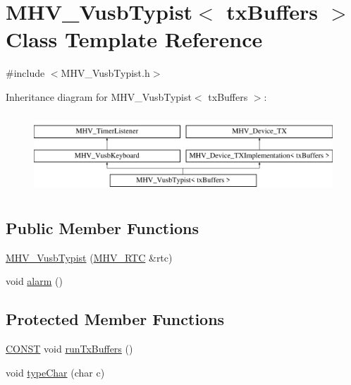 \hypertarget{class_m_h_v___vusb_typist}{\section{M\-H\-V\-\_\-\-Vusb\-Typist$<$ tx\-Buffers $>$ Class Template Reference}
\label{class_m_h_v___vusb_typist}
}


{\ttfamily \#include $<$M\-H\-V\-\_\-\-Vusb\-Typist.\-h$>$}

Inheritance diagram for M\-H\-V\-\_\-\-Vusb\-Typist$<$ tx\-Buffers $>$\-:\begin{figure}[H]
\begin{center}
\leavevmode
\includegraphics[height=3.000000cm]{class_m_h_v___vusb_typist}
\end{center}
\end{figure}
\subsection*{Public Member Functions}
\begin{DoxyCompactItemize}
\item 
\hyperlink{class_m_h_v___vusb_typist_a18ea6a0825c817909f3f3b54c27da348}{M\-H\-V\-\_\-\-Vusb\-Typist} (\hyperlink{class_m_h_v___r_t_c}{M\-H\-V\-\_\-\-R\-T\-C} \&rtc)
\item 
void \hyperlink{class_m_h_v___vusb_typist_affb513e7ee986fdbc001d7cbc037d4e4}{alarm} ()
\end{DoxyCompactItemize}
\subsection*{Protected Member Functions}
\begin{DoxyCompactItemize}
\item 
\hyperlink{_m_h_v__io_8h_a0c33b494a68ce28497e7ce8e5e95feff}{C\-O\-N\-S\-T} void \hyperlink{class_m_h_v___vusb_typist_aff30ddf6ba362fa02b44a21df31eba49}{run\-Tx\-Buffers} ()
\item 
void \hyperlink{class_m_h_v___vusb_typist_ad7c64ff9884b31c9f7112cff7d366913}{type\-Char} (char c)
\end{DoxyCompactItemize}
